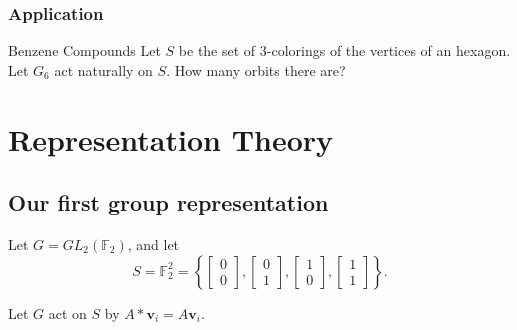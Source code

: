 
\subsection*{Application}

\begin{que}{Benzene Compounds}{}
  Let \(S\) be the set of \(3\)-colorings of the vertices of an hexagon.
  Let \(G_6\) act naturally on \(S\). How many orbits there are?
\end{que}

\chapter{Representation Theory}

\section{Our first group representation}

\begin{exmp}{}{}
  Let \(G = GL_2(\mathbb{F}_2)\), and let \[S = \mathbb{F}_2^2 = \left\{
	\begin{bmatrix} 0 \\ 0 \end{bmatrix},
	\begin{bmatrix} 0 \\ 1 \end{bmatrix},
	\begin{bmatrix} 1 \\ 0 \end{bmatrix},
	\begin{bmatrix} 1 \\ 1 \end{bmatrix}
  \right\}.\]

  Let \(G\) act on \(S\) by \(A * \mathbf{v}_i = A\mathbf{v}_i\).
\end{exmp}
